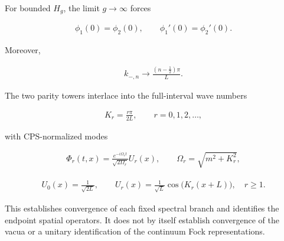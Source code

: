 For bounded $H_g$, the limit $g\to\infty$ forces

\begin{align}
\phi_1(0)=\phi_2(0),
\qquad
\phi_1'(0)=\phi_2'(0).
\end{align}

Moreover,

\begin{align}
k_{-,n}\longrightarrow\frac{(n-\frac12)\pi}{L}.
\end{align}

The two parity towers interlace into the full-interval wave numbers

\begin{align}
K_r=\frac{r\pi}{2L},
\qquad
r=0,1,2,\ldots,
\end{align}

with CPS-normalized modes

\begin{align}
\Phi_r(t,x)
=\frac{e^{-i\Omega_rt}}{\sqrt{2\Omega_r}}U_r(x),
\qquad
\Omega_r=\sqrt{m^2+K_r^2},
\end{align}

\begin{align}
U_0(x)=\frac{1}{\sqrt{2L}},
\qquad
U_r(x)=\frac{1}{\sqrt L}\cos\bigl(K_r(x+L)\bigr),
\quad r\geq1.
\end{align}

This establishes convergence of each fixed spectral branch and identifies the endpoint spatial operators. It does not by itself establish convergence of the vacua or a unitary identification of the continuum Fock representations.
